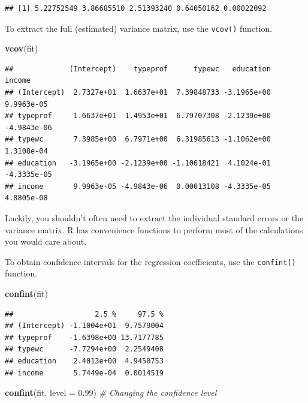 \documentclass[12pt,oneside,openany]{book}
\newenvironment{Shaded}{\begin{snugshade}}{\end{snugshade}}
\newcommand{\KeywordTok}[1]{\textcolor[rgb]{0.13,0.29,0.53}{\textbf{#1}}}
\newcommand{\DataTypeTok}[1]{\textcolor[rgb]{0.13,0.29,0.53}{#1}}
\newcommand{\FloatTok}[1]{\textcolor[rgb]{0.00,0.00,0.81}{#1}}
\newcommand{\CommentTok}[1]{\textcolor[rgb]{0.56,0.35,0.01}{\textit{#1}}}
\newcommand{\NormalTok}[1]{#1}
\begin{document}
\begin{verbatim}
## [1] 5.22752549 3.86685510 2.51393240 0.64050162 0.00022092
\end{verbatim}

To extract the full (estimated) variance matrix, use the \texttt{vcov()}
function.

\begin{Shaded}
\begin{Highlighting}[]
\KeywordTok{vcov}\NormalTok{(fit)}
\end{Highlighting}
\end{Shaded}

\begin{verbatim}
##             (Intercept)    typeprof      typewc   education      income
## (Intercept)  2.7327e+01  1.6637e+01  7.39848733 -3.1965e+00  9.9963e-05
## typeprof     1.6637e+01  1.4953e+01  6.79707308 -2.1239e+00 -4.9843e-06
## typewc       7.3985e+00  6.7971e+00  6.31985613 -1.1062e+00  1.3108e-04
## education   -3.1965e+00 -2.1239e+00 -1.10618421  4.1024e-01 -4.3335e-05
## income       9.9963e-05 -4.9843e-06  0.00013108 -4.3335e-05  4.8805e-08
\end{verbatim}

Luckily, you shouldn't often need to extract the individual standard
errors or the variance matrix. R has convenience functions to perform
most of the calculations you would care about.

To obtain confidence intervals for the regression coefficients, use the
\texttt{confint()} function.

\begin{Shaded}
\begin{Highlighting}[]
\KeywordTok{confint}\NormalTok{(fit)}
\end{Highlighting}
\end{Shaded}

\begin{verbatim}
##                   2.5 %     97.5 %
## (Intercept) -1.1004e+01  9.7579004
## typeprof    -1.6398e+00 13.7177785
## typewc      -7.7294e+00  2.2549408
## education    2.4013e+00  4.9450753
## income       5.7449e-04  0.0014519
\end{verbatim}

\begin{Shaded}
\begin{Highlighting}[]
\KeywordTok{confint}\NormalTok{(fit, }\DataTypeTok{level =} \FloatTok{0.99}\NormalTok{)  }\CommentTok{# Changing the confidence level}
\end{Highlighting}
\end{Shaded}
\end{document}
